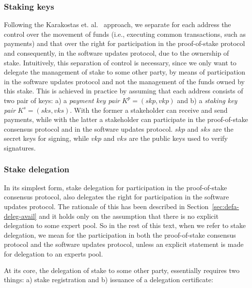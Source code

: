 \documentclass[11pt,a4paper]{article}
\begin{document}
\subsubsection{Staking keys}
\label{sec:staking-keys}

Following the Karakostas et. al.~\cite{stakepools} approach, we separate for
each address the control over the movement of funds (i.e., executing common
transactions, such as payments) and that over the right for participation in the
proof-of-stake protocol and consequently, in the software updates protocol, due
to the ownership of stake.
%
Intuitively, this separation of control is necessary, since we only want to
delegate the management of stake to some other party, by means of participation
in the software updates protocol and not the management of the funds owned by
this stake. This is achieved in practice by assuming that each address consists
of two pair of keys: a) a \emph{payment key pair} $K^p = (skp,vkp)$ and b) a
\emph{staking key pair} $K^s = (sks, vks)$. With the former a stakeholder can
receive and send payments, while with the latter a stakeholder can participate
in the proof-of-stake consensus protocol and in the software updates protocol.
$skp$ and $sks$ are the secret keys for signing, while $vkp$ and $vks$ are the
public keys used to verify signatures.

\subsubsection{Stake delegation}
\label{sec:stake-delegation}

In its simplest form, stake delegation for participation in the proof-of-stake
consensus protocol, also delegates the right for participation in the software
updates protocol.
%
The rationale of this has been described in Section~\ref{sec:defa-deleg-avail}
and it holds only on the assumption that there is no explicit delegation to some
expert pool.
%
So in the rest of this text, when we refer to stake delegation, we mean
for the participation in both the proof-of-stake consensus protocol and the
software updates protocol, unless an explicit statement is made for delegation
to an experts pool.

At its core, the delegation of stake to some other party, essentially requires
two things: a) stake registration and b) issuance of a delegation certificate:
\end{document}
